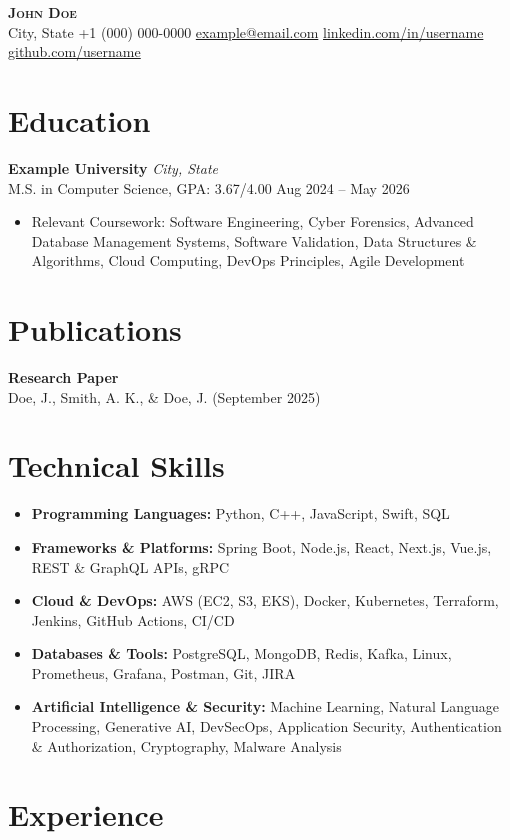 \documentclass[letterpaper,10.5pt]{article}
\makeatletter
\newcommand{\ResumeHeader}{
\begin{center}
    {\Large \scshape \textbf{John Doe}} \\[1mm]
    \footnotesize
    City, State \;\textbar\;
    +1 (000) 000-0000 \;\textbar\;
    \href{mailto:example@email.com}{example@email.com} \;\textbar\;
    \href{https://www.linkedin.com/in/username/}{linkedin.com/in/username} \;\textbar\;
    \href{https://github.com/username}{github.com/username}
\end{center}
}
\makeatother
\begin{document}
\ResumeHeader

\section{Education}

\textbf{Example University} \hfill \textit{City, State}\\
M.S. in Computer Science, GPA: 3.67/4.00 \hfill Aug 2024 -- May 2026
\begin{itemize}\itemsep 1pt
  \item Relevant Coursework: Software Engineering, Cyber Forensics, Advanced Database Management Systems, Software Validation, Data Structures \& Algorithms, Cloud Computing, DevOps Principles, Agile Development
\end{itemize}

\section{Publications}

\textbf{Research Paper}\\
Doe, J., Smith, A. K., \& Doe, J. (September 2025)

\section{Technical Skills}
\begin{itemize}\itemsep 1pt
  \item \textbf{Programming Languages:} Python, C++, JavaScript, Swift, SQL
  \item \textbf{Frameworks \& Platforms:} Spring Boot, Node.js, React, Next.js, Vue.js, REST \& GraphQL APIs, gRPC
  \item \textbf{Cloud \& DevOps:} AWS (EC2, S3, EKS), Docker, Kubernetes, Terraform, Jenkins, GitHub Actions, CI/CD
  \item \textbf{Databases \& Tools:} PostgreSQL, MongoDB, Redis, Kafka, Linux, Prometheus, Grafana, Postman, Git, JIRA
  \item \textbf{Artificial Intelligence \& Security:} Machine Learning, Natural Language Processing, Generative AI, DevSecOps, Application Security, Authentication \& Authorization, Cryptography, Malware Analysis
\end{itemize}

\section{Experience}
\end{document}
